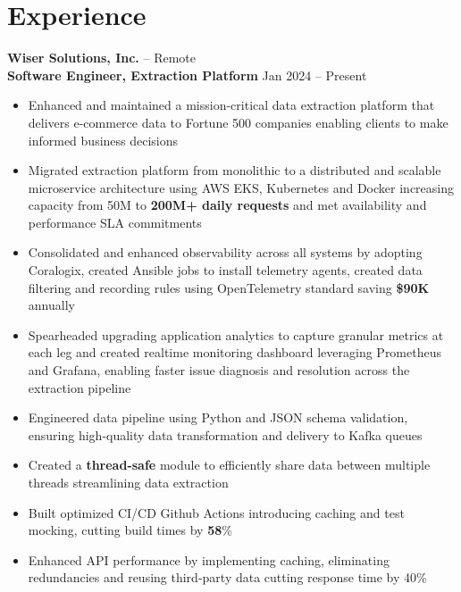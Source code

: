 \documentclass[11pt]{article}       %
\begin{document}
\section*{Experience}
\textbf{Wiser Solutions, Inc.} -- Remote \\
\textbf{Software Engineer, Extraction Platform} \hfill Jan 2024 -- Present \\
\vspace{-9pt}
\begin{itemize}
  \item Enhanced and maintained a mission-critical data extraction platform that delivers e-commerce data to Fortune 500 companies enabling clients to make informed business decisions \\
  \item Migrated extraction platform from monolithic to a distributed and scalable microservice architecture using AWS EKS, Kubernetes and Docker increasing capacity from 50M to \textbf{200M+ daily requests} and met availability and performance SLA commitments \\
  \item Consolidated and enhanced observability across all systems by adopting Coralogix, created Ansible jobs to install telemetry agents, created data filtering and recording rules using OpenTelemetry standard saving \textbf{\$90K} annually \\
  \item Spearheaded upgrading application analytics to capture granular metrics at each leg and created realtime monitoring dashboard leveraging Prometheus and Grafana, enabling faster issue diagnosis and resolution across the extraction pipeline \\
  \item Engineered data pipeline using Python and JSON schema validation, ensuring high-quality data transformation and delivery to Kafka queues \\
  \item Created a \textbf{thread-safe} module to efficiently share data between multiple threads streamlining data extraction \\
  \item Built optimized CI/CD Github Actions introducing caching and test mocking, cutting build times by \textbf{58}\% \\
  \item Enhanced API performance by implementing caching, eliminating redundancies and reusing third-party data cutting response time by 40\% \\
\end{itemize}
\end{document}
